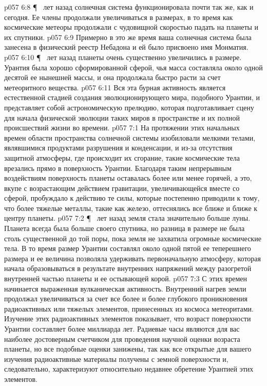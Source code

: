 \vs p057 6:8 \P\  лет назад солнечная система функционировала почти так же, как и сегодня. Ее члены продолжали увеличиваться в размерах, в то время как космические метеоры продолжали с чудовищной скоростью падать на планеты и их спутники.
\vs p057 6:9 Примерно в это же время ваша солнечная система была занесена в физический реестр Небадона и ей было присвоено имя Монматия.
\vs p057 6:10 \P\  лет назад планеты очень существенно увеличились в размере. Урантия была хорошо сформированной сферой, чья масса составляла около одной десятой ее нынешней массы, и она продолжала быстро расти за счет метеоритного вещества.
\vs p057 6:11 Вся эта бурная активность является естественной стадией создания эволюционирующего мира, подобного Урантии, и представляет собой астрономическую прелюдию, которая подготавливает сцену для начала физической эволюции таких миров в пространстве и их полной происшествий жизни во времени.
\vs p057 7:1 На протяжении этих начальных времен области пространства солнечной системы изобиловали мелкими телами, являвшимися продуктами разрушения и конденсации, и из\hyp{}за отсутствия защитной атмосферы, где происходит их сгорание, такие космические тела врезались прямо в поверхность Урантии. Благодаря таким непрерывным воздействиям поверхность планеты оставалась более или менее горячей, а это, вкупе с возрастающим действием гравитации, увеличивающейся вместе со сферой, пробуждало к действию те силы, которые постепенно приводили к тому, что более тяжелые металлы, такие как железо, оттеснялись все ближе и ближе к центру планеты.
\vs p057 7:2 \P\  лет назад земля стала значительно больше луны. Планета всегда была больше своего спутника, но разница в размере не была столь существенной до той поры, пока земля не захватила огромные космические тела. В то время размер Урантии составлял около одной пятой ее теперешнего размера и ее величина позволяла удерживать первоначальную атмосферу, которая начала образовываться в результате внутренних напряжений между разогретой внутренней частью планеты и ее остывающей корой.
\vs p057 7:3 С этих времен начинается выраженная вулканическая активность. Внутренний нагрев земли продолжал увеличиваться за счет все более и более глубокого проникновения радиоактивных или тяжелых элементов, принесенных из космоса метеоритами. Изучение этих радиоактивных элементов показывает, что возраст поверхности Урантии составляет более миллиарда лет. Радиевые часы являются для вас наиболее достоверным счетчиком для проведения научной оценки возраста планеты, но все подобные оценки занижены, так как все открытые для вашего изучения радиоактивные материалы получены с земной поверхности и, следовательно, характеризуют относительно недавнее обретение Урантией этих элементов.
